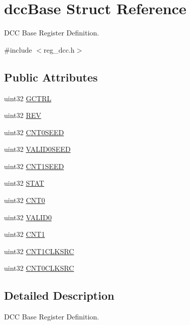 \hypertarget{structdccBase}{}\section{dcc\+Base Struct Reference}
\label{structdccBase}


D\+CC Base Register Definition.  




{\ttfamily \#include $<$reg\+\_\+dcc.\+h$>$}

\subsection*{Public Attributes}
\begin{DoxyCompactItemize}
\item 
uint32 \mbox{\hyperlink{structdccBase_a655b85bd1cd11cb7f50b441b07e58bed}{G\+C\+T\+RL}}
\item 
uint32 \mbox{\hyperlink{structdccBase_ad70d7ae72f9e49bcb75bfef62da53adb}{R\+EV}}
\item 
uint32 \mbox{\hyperlink{structdccBase_aba82f99ed2e90e633f0fd62cef5f1fda}{C\+N\+T0\+S\+E\+ED}}
\item 
uint32 \mbox{\hyperlink{structdccBase_addfa988fe6058c57f10b3b14f8a8f3cc}{V\+A\+L\+I\+D0\+S\+E\+ED}}
\item 
uint32 \mbox{\hyperlink{structdccBase_a30f283000ff6a267afafedd73c210997}{C\+N\+T1\+S\+E\+ED}}
\item 
uint32 \mbox{\hyperlink{structdccBase_a77b628cd6a60ca3b69c3cc646dbb2c41}{S\+T\+AT}}
\item 
uint32 \mbox{\hyperlink{structdccBase_a795802596137979a0f841d2caef9cc1a}{C\+N\+T0}}
\item 
uint32 \mbox{\hyperlink{structdccBase_aaa721e00ac4925fcf86eac56f6619412}{V\+A\+L\+I\+D0}}
\item 
uint32 \mbox{\hyperlink{structdccBase_a88d8af27ca66e5991f1ba5fd28a5d0c3}{C\+N\+T1}}
\item 
uint32 \mbox{\hyperlink{structdccBase_a27ce2a37291cd17e7862b781d9d9dfad}{C\+N\+T1\+C\+L\+K\+S\+RC}}
\item 
uint32 \mbox{\hyperlink{structdccBase_a94f30186a23285fe3382fa80c9f71b97}{C\+N\+T0\+C\+L\+K\+S\+RC}}
\end{DoxyCompactItemize}


\subsection{Detailed Description}
D\+CC Base Register Definition. 

